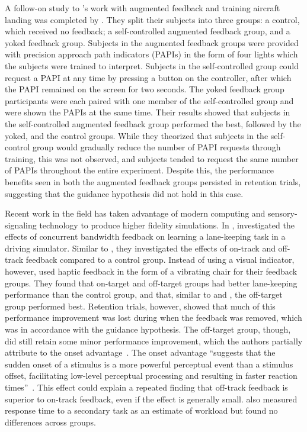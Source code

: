 A follow-on study to \citeauthor{doi:10.1177/001872088002200109}'s work with augmented feedback and training aircraft landing was completed by \citet{doi:10.1177/0018720809357343}.
They split their subjects into three groups: a control, which received no feedback; a self-controlled augmented feedback group, and a yoked feedback group.
Subjects in the augmented feedback groups were provided with precision approach path indicators (PAPIs) in the form of four lights which the subjects were trained to interpret.
Subjects in the self-controlled group could request a PAPI at any time by pressing a button on the controller, after which the PAPI remained on the screen for two seconds.
The yoked feedback group participants were each paired with one member of the self-controlled group and were shown the PAPIs at the same time.
Their results showed that subjects in the self-controlled augmented feedback group performed the best, followed by the yoked, and the control groups.
While they theorized that subjects in the self-control group would gradually reduce the number of PAPI requests through training, this was not observed, and subjects tended to request the same number of PAPIs throughout the entire experiment.
Despite this, the performance benefits seen in both the augmented feedback groups persisted in retention trials, suggesting that the guidance hypothesis did not hold in this case.

Recent work in the field has taken advantage of modern computing and sensory-signaling technology to produce higher fidelity simulations.
In \citeyear{de_groot_effect_2011}, \citeauthor{de_groot_effect_2011} investigated the effects of concurrent bandwidth feedback on learning a lane-keeping task in a driving simulator.
Similar to \citeauthor{gordon_effect_1967}, they investigated the effects of on-track and off-track feedback compared to a control group.
Instead of using a visual indicator, however, \citeauthor{de_groot_effect_2011} used haptic feedback in the form of a vibrating chair for their feedback groups.
They found that on-target and off-target groups had better lane-keeping performance than the control group, and that, similar to \citeauthor{gordon_effect_1967} and \citeauthor{williams_-target_1962}, the off-target group performed best.
Retention trials, however, showed that much of this performance improvement was lost during when the feedback was removed, which was in accordance with the guidance hypothesis.
The off-target group, though, did still retain some minor performance improvement, which the authors partially attribute to the onset advantage~\citep{fischer_differential_2008}.
The onset advantage ``suggests that the sudden onset of a stimulus is a more powerful perceptual event than a stimulus offset, facilitating low-level perceptual processing and resulting in faster reaction times''~\citep{de_groot_effect_2011}.
This effect could explain a repeated finding that off-track feedback is superior to on-track feedback, even if the effect is generally small.
\citeauthor{de_groot_effect_2011} also measured response time to a secondary task as an estimate of workload but found no differences across groups.

